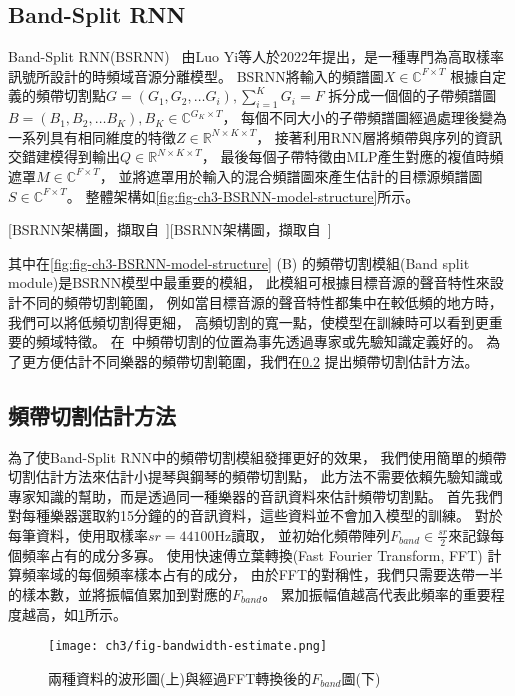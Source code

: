 \documentclass[class=NCU_thesis, crop=false]{standalone}
\begin{document}
\subsection{Band-Split RNN} \label{ch3-subst-band-split-RNN}
Band-Split RNN(BSRNN)~\cite{Luo_Yi2022MusicSourceSeparation}
由Luo Yi等人於2022年提出，是一種專門為高取樣率訊號所設計的時頻域音源分離模型。
BSRNN將輸入的頻譜圖$X\in \mathbb{C} ^{F\times T}$
根據自定義的頻帶切割點$G = (G_1, G_2, \dots G_i), \sum_{i = 1}^{K} G_i = F $
拆分成一個個的子帶頻譜圖$B = (B_1, B_2, \dots B_K), B_K \in \mathbb{C}^{G_K\times T}$，
每個不同大小的子帶頻譜圖經過處理後變為一系列具有相同維度的特徵$Z\in \mathbb{R}^{N\times K\times T}$，
接著利用RNN層將頻帶與序列的資訊交錯建模得到輸出$Q\in \mathbb{R}^{N\times K\times T}$，
最後每個子帶特徵由MLP產生對應的複值時頻遮罩$M\in \mathbb{C}^{F\times T}$，
並將遮罩用於輸入的混合頻譜圖來產生估計的目標源頻譜圖$S\in \mathbb{C}^{F\times T}$。
整體架構如\cref{fig:fig-ch3-BSRNN-model-structure}所示。

[BSRNN架構圖，擷取自~\cite{Luo_Yi2022MusicSourceSeparation}][BSRNN架構圖，擷取自~\cite{Luo_Yi2022MusicSourceSeparation}]

其中在\cref{fig:fig-ch3-BSRNN-model-structure} (B) 
的頻帶切割模組(Band split module)是BSRNN模型中最重要的模組，
此模組可根據目標音源的聲音特性來設計不同的頻帶切割範圍，
例如當目標音源的聲音特性都集中在較低頻的地方時，我們可以將低頻切割得更細，
高頻切割的寬一點，使模型在訓練時可以看到更重要的頻域特徵。
在~\cite{Luo_Yi2022MusicSourceSeparation}中頻帶切割的位置為事先透過專家或先驗知識定義好的。
為了更方便估計不同樂器的頻帶切割範圍，我們在\cref{ch3-subst-estimate-band-split-point}
提出頻帶切割估計方法。

\subsection{頻帶切割估計方法} \label{ch3-subst-estimate-band-split-point}
為了使Band-Split RNN中的頻帶切割模組發揮更好的效果，
我們使用簡單的頻帶切割估計方法來估計小提琴與鋼琴的頻帶切割點，
此方法不需要依賴先驗知識或專家知識的幫助，而是透過同一種樂器的音訊資料來估計頻帶切割點。
首先我們對每種樂器選取約15分鐘的的音訊資料，這些資料並不會加入模型的訓練。
對於每筆資料，使用取樣率$sr = 44100$Hz讀取，
並初始化頻帶陣列$F_{band} \in \frac{sr}{2}$來記錄每個頻率占有的成分多寡。
使用快速傅立葉轉換(Fast Fourier Transform, FFT)
計算頻率域的每個頻率樣本占有的成分，
由於FFT的對稱性，我們只需要迭帶一半的樣本數，並將振幅值累加到對應的$F_{band}$。
累加振幅值越高代表此頻率的重要程度越高，如\cref{fig:fig-ch3-bandwidth-estimate}所示。
\begin{figure}[H]
    \centering
    \texttt{[image: ch3/fig-bandwidth-estimate.png]}
    \caption{兩種資料的波形圖(上)與經過FFT轉換後的$F_{band}$圖(下)}
    \label{fig:fig-ch3-bandwidth-estimate}
\end{figure}
\end{document}
